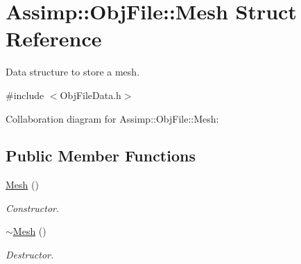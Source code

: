 \hypertarget{struct_assimp_1_1_obj_file_1_1_mesh}{\section{Assimp\+:\+:Obj\+File\+:\+:Mesh Struct Reference}
\label{struct_assimp_1_1_obj_file_1_1_mesh}
}


Data structure to store a mesh.  




{\ttfamily \#include $<$Obj\+File\+Data.\+h$>$}



Collaboration diagram for Assimp\+:\+:Obj\+File\+:\+:Mesh\+:
\subsection*{Public Member Functions}
\begin{DoxyCompactItemize}
\item 
\hypertarget{struct_assimp_1_1_obj_file_1_1_mesh_a25376a40471b585335fb133bfb22eaa0}{\hyperlink{struct_assimp_1_1_obj_file_1_1_mesh_a25376a40471b585335fb133bfb22eaa0}{Mesh} ()}\label{struct_assimp_1_1_obj_file_1_1_mesh_a25376a40471b585335fb133bfb22eaa0}

\begin{DoxyCompactList}\small\item\em Constructor. \end{DoxyCompactList}\item 
\hypertarget{struct_assimp_1_1_obj_file_1_1_mesh_a24b43d2a198611c6c6e97112515ad2fb}{\hyperlink{struct_assimp_1_1_obj_file_1_1_mesh_a24b43d2a198611c6c6e97112515ad2fb}{$\sim$\+Mesh} ()}\label{struct_assimp_1_1_obj_file_1_1_mesh_a24b43d2a198611c6c6e97112515ad2fb}

\begin{DoxyCompactList}\small\item\em Destructor. \end{DoxyCompactList}\end{DoxyCompactItemize}
